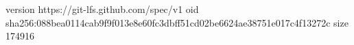 version https://git-lfs.github.com/spec/v1
oid sha256:088bea0114cab9f9f013e8e60fc3dbff51cd02be6624ae38751e017c4f13272c
size 174916
